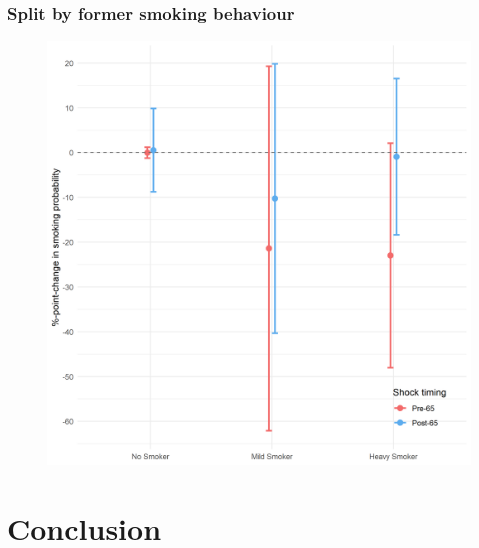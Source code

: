 \documentclass[10pt,compress,xcolor=dvipsnames,aspectratio=169]{beamer}    %
\newcounter{ex}
\newcommand{\1}[1]{\mathrm{1\hspace*{-2.5pt}l}[#1]}	%
\begin{document}
\begin{frame}
\frametitle{Split by former smoking behaviour}

\begin{figure}[hbtp]
	\centering
	\includegraphics[height=0.8\textheight]{../../3_output/shock_effects/fSmokeB_6070_100_cv.png}
	\label{fig:edu}
\end{figure}
\hyperlink{frame:otherX}{}
\end{frame}


\section{Conclusion}
\end{document}
